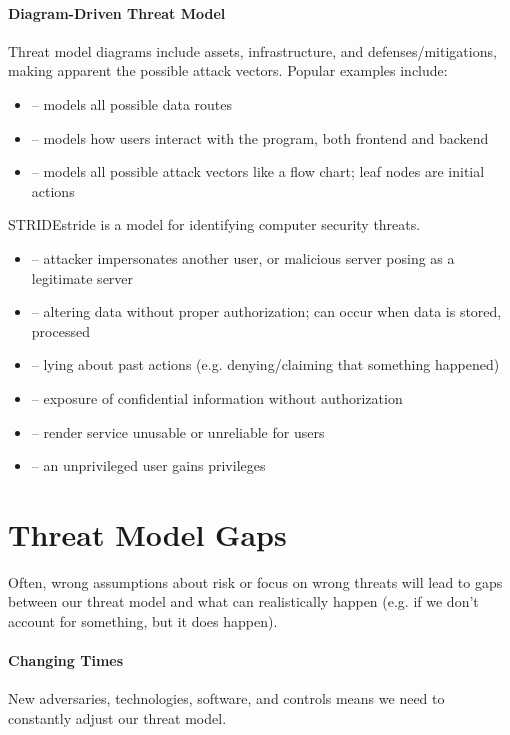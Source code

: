 \documentclass[12pt]{report}
\begin{document}
\paragraph{Diagram-Driven Threat Model}
Threat model diagrams include assets, infrastructure, and defenses/mitigations, making apparent the possible attack vectors. Popular examples include:
\begin{itemize}
    \item {} -- models all possible data routes
    \item {} -- models how users interact with the program, both frontend and backend
    \item {} -- models all possible attack vectors like a flow chart; leaf nodes are initial actions
\end{itemize}

\begin{dfnbox}{STRIDE}{stride}
     is a model for identifying computer security threats.
    \begin{itemize}
        \item {} -- attacker impersonates another user, or malicious server posing as a legitimate server
        \item {} -- altering data without proper authorization; can occur when data is stored, processed
        \item {} -- lying about past actions (e.g. denying/claiming that something happened)
        \item {} -- exposure of confidential information without authorization
        \item {} -- render service unusable or unreliable for users
        \item {} -- an unprivileged user gains privileges
    \end{itemize}
\end{dfnbox}

\section{Threat Model Gaps}
Often, wrong assumptions about risk or focus on wrong threats will lead to gaps between our threat model and what can realistically happen (e.g. if we don't account for something, but it does happen).

\paragraph{Changing Times}
New adversaries, technologies, software, and controls means we need to constantly adjust our threat model.
\end{document}
